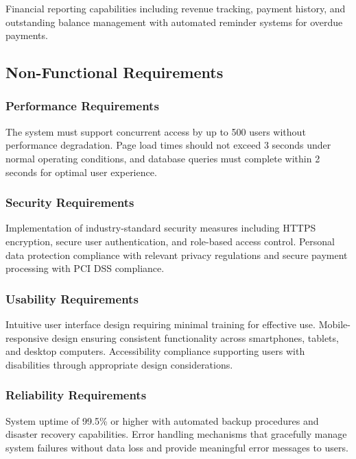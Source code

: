 \documentclass[12pt,a4paper]{report}
\begin{document}
Financial reporting capabilities including revenue tracking, payment history, and outstanding balance management with automated reminder systems for overdue payments.

\subsection{Non-Functional Requirements}

\subsubsection{Performance Requirements}

The system must support concurrent access by up to 500 users without performance degradation. Page load times should not exceed 3 seconds under normal operating conditions, and database queries must complete within 2 seconds for optimal user experience.

\subsubsection{Security Requirements}

Implementation of industry-standard security measures including HTTPS encryption, secure user authentication, and role-based access control. Personal data protection compliance with relevant privacy regulations and secure payment processing with PCI DSS compliance.

\subsubsection{Usability Requirements}

Intuitive user interface design requiring minimal training for effective use. Mobile-responsive design ensuring consistent functionality across smartphones, tablets, and desktop computers. Accessibility compliance supporting users with disabilities through appropriate design considerations.

\subsubsection{Reliability Requirements}

System uptime of 99.5\% or higher with automated backup procedures and disaster recovery capabilities. Error handling mechanisms that gracefully manage system failures without data loss and provide meaningful error messages to users.
\end{document}
